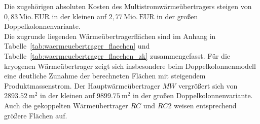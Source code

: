 Die zugehörigen absoluten Kosten des Multistromwärmeübertragers steigen von \(0{,}83\,\mathrm{Mio.\,EUR}\) in der kleinen auf
\(2{,}77\,\mathrm{Mio.\,EUR}\) in der großen Doppelkolonnenvariante.\\
Die zugrunde liegenden Wärmeübertragerflächen sind im Anhang in
Tabelle~\ref{tab:waermeuebertrager_flaechen} und Tabelle~\ref{tab:waermeuebertrager_flaechen_zk}
zusammengefasst. Für die kryogenen Wärmeübertrager zeigt sich insbesondere beim Doppelkolonnenmodell eine deutliche Zunahme der berechneten Flächen mit steigendem Produktmassenstrom. Der Hauptwärmeübertrager \(MW\) vergrößert sich
von \(\SI{2893.52}{\square\metre}\) in der kleinen auf
\(\SI{9899.75}{\square\metre}\) in der großen Doppelkolonnenvariante. Auch die gekoppelten Wärmeübertrager \(RC\) und \(RC2\) weisen entsprechend größere Flächen auf.\\

